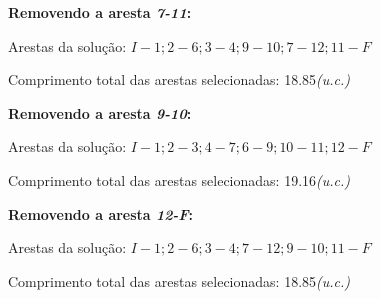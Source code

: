 \documentclass[runningheads]{llncs}
\begin{document}
    \bigskip
    \textbf{Removendo a aresta \textit{7-11}:}

    Arestas da solução: $I-1; 2-6; 3-4; 9-10; 7-12; 11-F$

    Comprimento total das arestas selecionadas: 18.85\textit{(u.c.)}

    \bigskip
    \textbf{Removendo a aresta \textit{9-10}:}

    Arestas da solução: $I-1; 2-3; 4-7; 6-9; 10-11; 12-F$

    Comprimento total das arestas selecionadas: 19.16\textit{(u.c.)}

    \bigskip
    \textbf{Removendo a aresta \textit{12-F}:}

    Arestas da solução: $I-1; 2-6; 3-4; 7-12; 9-10; 11-F$

    Comprimento total das arestas selecionadas: 18.85\textit{(u.c.)}


\end{document}
